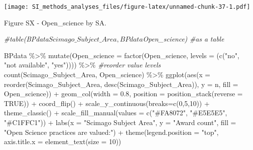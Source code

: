 \documentclass[
]{article}
\newenvironment{Shaded}{\begin{snugshade}}{\end{snugshade}}
\newcommand{\AttributeTok}[1]{\textcolor[rgb]{0.77,0.63,0.00}{#1}}
\newcommand{\CommentTok}[1]{\textcolor[rgb]{0.56,0.35,0.01}{\textit{#1}}}
\newcommand{\ConstantTok}[1]{\textcolor[rgb]{0.00,0.00,0.00}{#1}}
\newcommand{\DecValTok}[1]{\textcolor[rgb]{0.00,0.00,0.81}{#1}}
\newcommand{\FloatTok}[1]{\textcolor[rgb]{0.00,0.00,0.81}{#1}}
\newcommand{\FunctionTok}[1]{\textcolor[rgb]{0.00,0.00,0.00}{#1}}
\newcommand{\NormalTok}[1]{#1}
\newcommand{\SpecialCharTok}[1]{\textcolor[rgb]{0.00,0.00,0.00}{#1}}
\newcommand{\StringTok}[1]{\textcolor[rgb]{0.31,0.60,0.02}{#1}}
\begin{document}
\texttt{[image: SI\_methods\_analyses\_files/figure-latex/unnamed-chunk-37-1.pdf]}

Figure SX - Open\_science by SA.

\begin{Shaded}
\begin{Highlighting}[]
\CommentTok{\#table(BPdata$Scimago\_Subject\_Area, BPdata$Open\_science) \#as a table}

\NormalTok{BPdata }\SpecialCharTok{\%\textgreater{}\%} 
    \FunctionTok{mutate}\NormalTok{(}\AttributeTok{Open\_science =} \FunctionTok{factor}\NormalTok{(Open\_science, }\AttributeTok{levels =}\NormalTok{ (}\FunctionTok{c}\NormalTok{(}\StringTok{"no"}\NormalTok{, }\StringTok{"not available"}\NormalTok{, }\StringTok{"yes"}\NormalTok{)))) }\SpecialCharTok{\%\textgreater{}\%} \CommentTok{\#reorder value levels}
    \FunctionTok{count}\NormalTok{(Scimago\_Subject\_Area, Open\_science) }\SpecialCharTok{\%\textgreater{}\%}
    \FunctionTok{ggplot}\NormalTok{(}\FunctionTok{aes}\NormalTok{(}\AttributeTok{x =} \FunctionTok{reorder}\NormalTok{(Scimago\_Subject\_Area, }\FunctionTok{desc}\NormalTok{(Scimago\_Subject\_Area)), }\AttributeTok{y =}\NormalTok{ n, }\AttributeTok{fill =}\NormalTok{ Open\_science)) }\SpecialCharTok{+} 
    \FunctionTok{geom\_col}\NormalTok{(}\AttributeTok{width =} \FloatTok{0.8}\NormalTok{, }\AttributeTok{position =} \FunctionTok{position\_stack}\NormalTok{(}\AttributeTok{reverse =} \ConstantTok{TRUE}\NormalTok{)) }\SpecialCharTok{+}
    \FunctionTok{coord\_flip}\NormalTok{() }\SpecialCharTok{+}
    \FunctionTok{scale\_y\_continuous}\NormalTok{(}\AttributeTok{breaks=}\FunctionTok{c}\NormalTok{(}\DecValTok{0}\NormalTok{,}\DecValTok{5}\NormalTok{,}\DecValTok{10}\NormalTok{)) }\SpecialCharTok{+}
    \FunctionTok{theme\_classic}\NormalTok{() }\SpecialCharTok{+} 
    \FunctionTok{scale\_fill\_manual}\NormalTok{(}\AttributeTok{values =} \FunctionTok{c}\NormalTok{(}\StringTok{"\#FA8072"}\NormalTok{, }\StringTok{"\#E5E5E5"}\NormalTok{, }\StringTok{"\#C1FFC1"}\NormalTok{)) }\SpecialCharTok{+}
    \FunctionTok{labs}\NormalTok{(}\AttributeTok{x =} \StringTok{"Scimago Subject Area"}\NormalTok{, }\AttributeTok{y =} \StringTok{"Award count"}\NormalTok{, }\AttributeTok{fill =} \StringTok{"Open Science practices are valued:"}\NormalTok{) }\SpecialCharTok{+} 
    \FunctionTok{theme}\NormalTok{(}\AttributeTok{legend.position =} \StringTok{"top"}\NormalTok{, }\AttributeTok{axis.title.x =} \FunctionTok{element\_text}\NormalTok{(}\AttributeTok{size =} \DecValTok{10}\NormalTok{))}
\end{Highlighting}
\end{Shaded}
\end{document}
